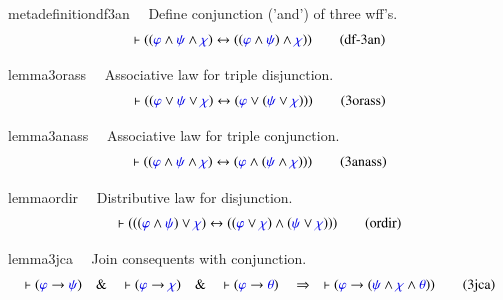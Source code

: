 \begin{restatable}{metadefinition}{df3an}~~ Define conjunction ('and') of three
wff's.  
\begin{align}
\vdash ( ( \mw{\varphi} \wedge \mw{\psi} \wedge \mw{\chi} ) \leftrightarrow ( (
    \mw{\varphi} \wedge \mw{\psi} ) \wedge \mw{\chi} )
    )\label{eq:df-3an}\tag{df-3an}
\end{align}
\end{restatable}

\begin{restatable}{lemma}{3orass}~~ Associative law for triple disjunction. 
~
\begin{align}
\vdash ( ( \mw{\varphi} \vee \mw{\psi} \vee \mw{\chi} ) \leftrightarrow (
    \mw{\varphi} \vee ( \mw{\psi} \vee \mw{\chi} ) )
    )\label{eq:3orass}\tag{3orass}
\end{align}
\end{restatable}

\begin{restatable}{lemma}{3anass}~~ Associative law for triple conjunction. 
~
\begin{align}
\vdash ( ( \mw{\varphi} \wedge \mw{\psi} \wedge \mw{\chi} ) \leftrightarrow (
    \mw{\varphi} \wedge ( \mw{\psi} \wedge \mw{\chi} ) )
    )\label{eq:3anass}\tag{3anass}
\end{align}
\end{restatable}

\begin{restatable}{lemma}{ordir}~~ Distributive law for disjunction. 
~
\begin{align}
\vdash ( ( ( \mw{\varphi} \wedge \mw{\psi} ) \vee \mw{\chi} ) \leftrightarrow (
    ( \mw{\varphi} \vee \mw{\chi} ) \wedge ( \mw{\psi} \vee \mw{\chi} ) )
    )\label{eq:ordir}\tag{ordir}
\end{align}
\end{restatable}

\begin{restatable}{lemma}{3jca}~~ Join consequents with conjunction. 
~
\begin{align}
\vdash ( \mw{\varphi} \rightarrow \mw{\psi} )\quad\&\quad \vdash ( \mw{\varphi}
    \rightarrow \mw{\chi} )\quad\&\quad \vdash ( \mw{\varphi} \rightarrow
    \mw{\theta} )\quad\Rightarrow\quad \vdash ( \mw{\varphi} \rightarrow (
    \mw{\psi} \wedge \mw{\chi} \wedge \mw{\theta} ) )\label{eq:3jca}\tag{3jca}
\end{align}
\end{restatable}

